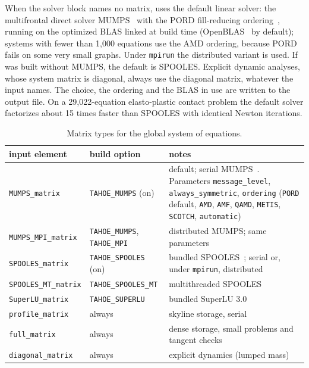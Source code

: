 When the solver block names no matrix, \tahoe uses the default linear
solver: the multifrontal direct solver \textsf{MUMPS}~\cite{Amestoy2001}
with the \textsf{PORD} fill-reducing ordering~\cite{Schulze2001}, running on
the optimized BLAS linked at build time (\textsf{OpenBLAS}~\cite{OpenBLAS} by
default); systems with fewer than 1{,}000 equations use the AMD ordering,
because \textsf{PORD} fails on some very small graphs.  Under
\texttt{mpirun} the distributed variant is used.  If \tahoe
was built without \textsf{MUMPS}, the default is \textsf{SPOOLES}.  Explicit
dynamic analyses, whose system matrix is diagonal, always use the diagonal
matrix, whatever the input names.  The choice, the ordering and the BLAS in
use are written to the output file.  On a 29{,}022-equation elasto-plastic
contact problem the default solver factorizes about 15 times faster than
\textsf{SPOOLES} with identical Newton iterations.
\begin{table}[h]
\caption{\label{tab.matrix.types} Matrix types for the global system
of equations.}
\begin{center}
\begin{tabular}[c]{|p{1.9in}|>{\raggedright\arraybackslash}p{1.2in}|>{\raggedright\arraybackslash}p{2.5in}|}
\hline
\textbf{input element} & \textbf{build option} & \textbf{notes}\\
\hline
\texttt{MUMPS\_matrix} & \texttt{TAHOE\_MUMPS} (on) & default; serial \textsf{MUMPS}~\cite{Amestoy2001}.
  Parameters \texttt{message\_level}, \texttt{always\_symmetric},
  \texttt{ordering} (\texttt{PORD} default, \texttt{AMD}, \texttt{AMF},
  \texttt{QAMD}, \texttt{METIS}, \texttt{SCOTCH}, \texttt{automatic})\\
\hline
\texttt{MUMPS\_MPI\_matrix} & \texttt{TAHOE\_MUMPS}, \texttt{TAHOE\_MPI} & distributed \textsf{MUMPS}; same parameters\\
\hline
\texttt{SPOOLES\_matrix} & \texttt{TAHOE\_SPOOLES} (on) & bundled \textsf{SPOOLES}~\cite{SPOOLESv22}; serial or, under \texttt{mpirun}, distributed\\
\hline
\texttt{SPOOLES\_MT\_matrix} & \texttt{TAHOE\_SPOOLES\_MT} & multithreaded \textsf{SPOOLES}\\
\hline
\texttt{SuperLU\_matrix} & \texttt{TAHOE\_SUPERLU} & bundled SuperLU 3.0\\
\hline
\texttt{profile\_matrix} & always & skyline storage, serial\\
\hline
\texttt{full\_matrix} & always & dense storage, small problems and tangent checks\\
\hline
\texttt{diagonal\_matrix} & always & explicit dynamics (lumped mass)\\
\hline
\end{tabular}
\end{center}
\end{table}

